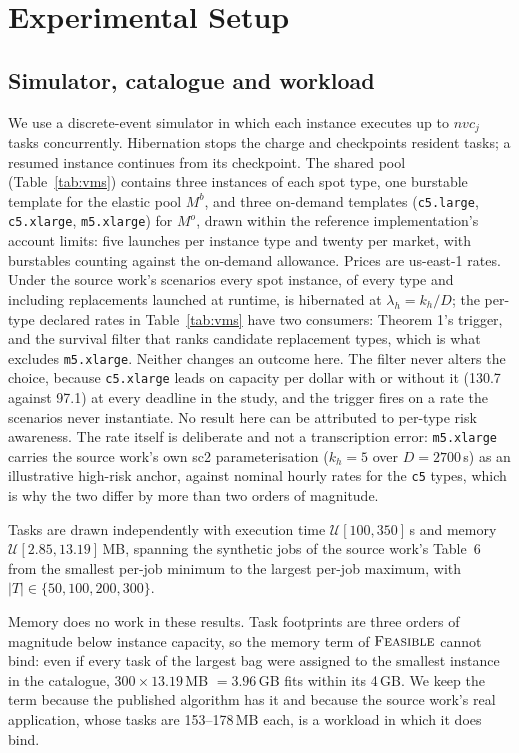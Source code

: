 \documentclass[conference]{IEEEtran}
\begin{document}
\section{Experimental Setup}
\label{sec:setup}

\subsection{Simulator, catalogue and workload}

We use a discrete-event simulator in which each instance executes up to
$\mathit{nvc}_j$ tasks concurrently. Hibernation stops the charge and
checkpoints resident tasks; a resumed instance continues from its checkpoint.
The shared pool (Table~\ref{tab:vms}) contains three instances of each spot
type, one burstable template for the elastic pool $M^{b}$, and three on-demand
templates (\texttt{c5.large}, \texttt{c5.xlarge}, \texttt{m5.xlarge}) for
$M^{o}$, drawn within the reference implementation's account limits: five
launches per instance type and twenty per market, with burstables counting
against the on-demand allowance. Prices are us-east-1 rates. Under the source
work's scenarios every spot instance, of every type and including replacements
launched at runtime, is hibernated at $\lambda_h = k_h/D$; the per-type
declared rates in Table~\ref{tab:vms} have two consumers: Theorem 1's trigger,
and the survival filter that ranks candidate replacement types, which is what
excludes \texttt{m5.xlarge}. Neither changes an outcome here. The filter never
alters the choice, because \texttt{c5.xlarge} leads on capacity per dollar with
or without it (130.7 against 97.1) at every deadline in the study, and the
trigger fires on a rate the scenarios never instantiate. No result here can be
attributed to per-type risk awareness. The rate itself is deliberate and not a
transcription error: \texttt{m5.xlarge} carries the source work's own sc2
parameterisation ($k_h = 5$ over $D = 2700$\,s) as an illustrative high-risk
anchor, against nominal hourly rates for the \texttt{c5} types, which is why
the two differ by more than two orders of magnitude.

Tasks are drawn independently with execution time
$\mathcal{U}[100,350]$\,s and memory $\mathcal{U}[2.85,13.19]$\,MB, spanning
the synthetic jobs of the source work's Table~6 from the smallest per-job
minimum to the largest per-job maximum, with $|T| \in \{50,100,200,300\}$.

Memory does no work in these results. Task footprints are three orders of
magnitude below instance capacity, so the memory term of
$\textsc{Feasible}$ cannot bind: even if every task of the largest bag were
assigned to the smallest instance in the catalogue,
$300 \times 13.19$\,MB $=3.96$\,GB fits within its 4\,GB. We keep the term
because the published algorithm has it and because the source work's real
application, whose tasks are 153--178\,MB each, is a workload in which it does
bind.
\end{document}
